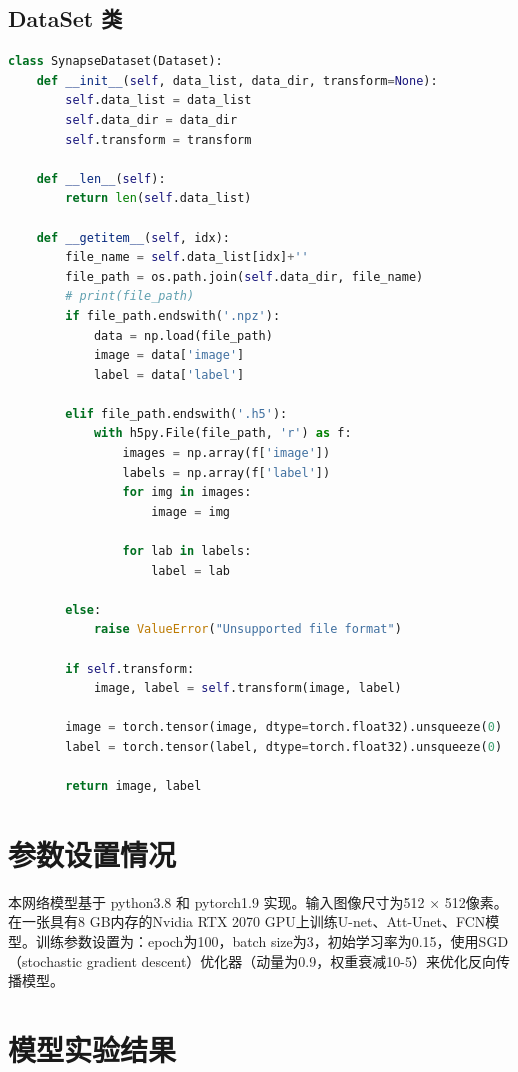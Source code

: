 \documentclass[a4paper,12pt]{report}
\begin{document}
\subsection{DataSet 类}

\begin{lstlisting}[language=Python]
class SynapseDataset(Dataset):
    def __init__(self, data_list, data_dir, transform=None):
        self.data_list = data_list
        self.data_dir = data_dir
        self.transform = transform

    def __len__(self):
        return len(self.data_list)

    def __getitem__(self, idx):
        file_name = self.data_list[idx]+''
        file_path = os.path.join(self.data_dir, file_name)
        # print(file_path)
        if file_path.endswith('.npz'):
            data = np.load(file_path)
            image = data['image']
            label = data['label']

        elif file_path.endswith('.h5'):
            with h5py.File(file_path, 'r') as f:
                images = np.array(f['image'])
                labels = np.array(f['label'])
                for img in images:
                    image = img

                for lab in labels:
                    label = lab

        else:
            raise ValueError("Unsupported file format")
        
        if self.transform:
            image, label = self.transform(image, label)
        
        image = torch.tensor(image, dtype=torch.float32).unsqueeze(0)  
        label = torch.tensor(label, dtype=torch.float32).unsqueeze(0)

        return image, label
\end{lstlisting}

\section{参数设置情况}
本网络模型基于 python3.8 和 pytorch1.9 实现。输入图像尺寸为512 × 512像素。在一张具有8 GB内存的Nvidia RTX 2070 GPU上训练U-net、Att-Unet、FCN模型。训练参数设置为：epoch为100，batch size为3，初始学习率为0.15，使用SGD（stochastic gradient descent）优化器（动量为0.9，权重衰减10-5）来优化反向传播模型。


\section{模型实验结果}
\end{document}

